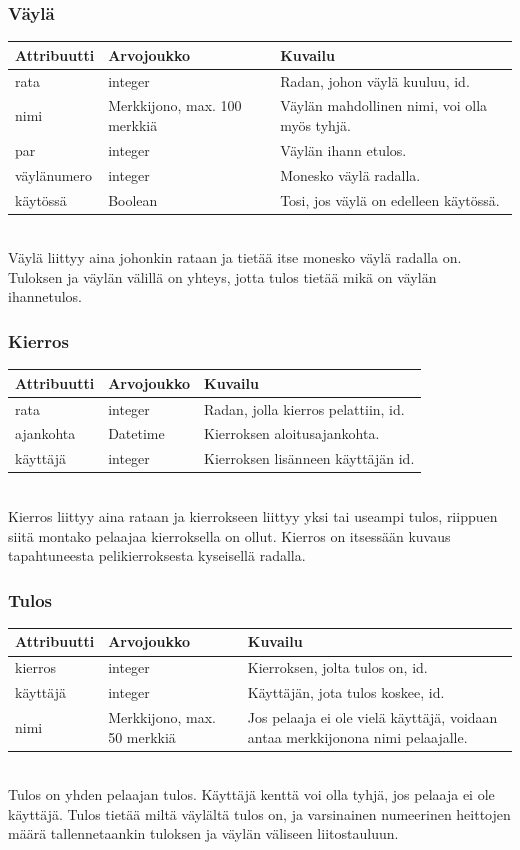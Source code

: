 \documentclass[10pt,a4paper]{article}
\begin{document}
\subsubsection{Väylä}
    \begin{tabular}{ | l | p{3cm} | p{5cm} |}
    \hline
    Attribuutti & Arvojoukko & Kuvailu\\ \hline
    rata & integer & Radan, johon väylä kuuluu, id. \\ \hline
    nimi & Merkkijono, max. 100 merkkiä & Väylän mahdollinen nimi, voi olla myös tyhjä. \\ \hline
    par & integer & Väylän ihann	etulos. \\ \hline
    väylänumero & integer & Monesko väylä radalla. \\ \hline
    käytössä & Boolean & Tosi, jos väylä on edelleen käytössä. \\ \hline
    \end{tabular}\\
Väylä liittyy aina johonkin rataan ja tietää itse monesko väylä radalla on. Tuloksen ja väylän välillä on yhteys, jotta tulos tietää mikä on väylän ihannetulos.
\subsubsection{Kierros}
    \begin{tabular}{ | l | p{3cm} | p{5cm} |}
    \hline
    Attribuutti & Arvojoukko & Kuvailu\\ \hline
    rata & integer & Radan, jolla kierros pelattiin, id. \\ \hline
    ajankohta & Datetime & Kierroksen aloitusajankohta. \\ \hline
    käyttäjä & integer & Kierroksen lisänneen käyttäjän id. \\ \hline
    \end{tabular}\\
Kierros liittyy aina rataan ja kierrokseen liittyy yksi tai useampi tulos, riippuen siitä montako pelaajaa kierroksella on ollut. Kierros on itsessään kuvaus tapahtuneesta pelikierroksesta kyseisellä radalla.
\subsubsection{Tulos}
    \begin{tabular}{ | l | p{3cm} | p{5cm} |}
    \hline
    Attribuutti & Arvojoukko & Kuvailu\\ \hline
    kierros & integer & Kierroksen, jolta tulos on, id. \\ \hline
    käyttäjä & integer & Käyttäjän, jota tulos koskee, id. \\ \hline
    nimi & Merkkijono, max. 50 merkkiä & Jos pelaaja ei ole vielä käyttäjä, voidaan antaa merkkijonona nimi pelaajalle. \\ \hline
    \end{tabular}\\
Tulos on yhden pelaajan tulos. Käyttäjä kenttä voi olla tyhjä, jos pelaaja ei ole käyttäjä. Tulos tietää miltä väylältä tulos on, ja varsinainen numeerinen heittojen määrä tallennetaankin tuloksen ja väylän väliseen liitostauluun.
\newpage
\end{document}

